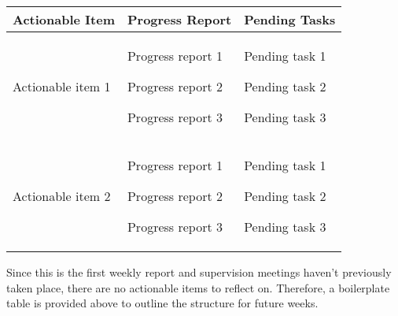 \begin{table}[!h]
    \centering
    \begin{tabularx}{\textwidth}{|X|X|X|}
        \hline
        Actionable Item & Progress Report & Pending Tasks \\
        \hline
        \hline
        \begin{myitemize}
            \item Actionable item 1
        \end{myitemize} & 
        \begin{myitemize}
            \item Progress report 1
            \item Progress report 2
            \item Progress report 3
        \end{myitemize} & 
        \begin{myitemize}
            \item Pending task 1
            \item Pending task 2
            \item Pending task 3
        \end{myitemize} \\
        \hline
        \begin{myitemize}
            \item Actionable item 2
        \end{myitemize} & 
        \begin{myitemize}
            \item Progress report 1
            \item Progress report 2
            \item Progress report 3
        \end{myitemize} & 
        \begin{myitemize}
            \item Pending task 1
            \item Pending task 2
            \item Pending task 3
        \end{myitemize} \\
        \hline
    \end{tabularx}
\end{table}

Since this is the first weekly report and supervision meetings haven't previously taken place, there are no actionable items to reflect on. Therefore, a boilerplate table is provided above to outline the structure for future weeks.